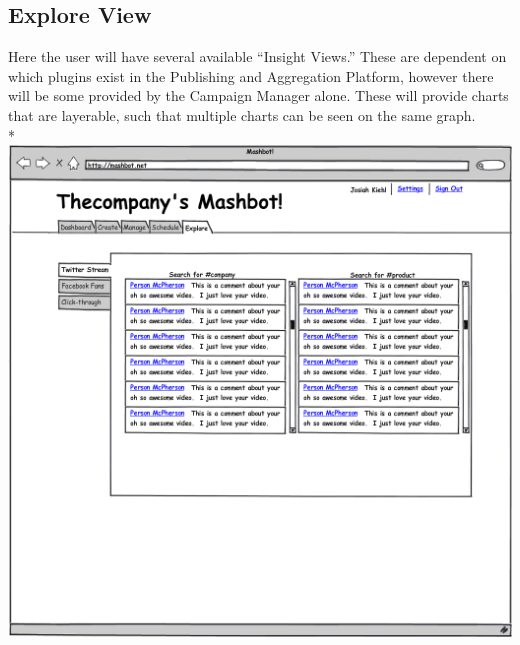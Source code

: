 \documentclass{report}
\begin{document}
\subsection{Explore View}
 Here the user will have several available ``Insight Views.''  These are dependent on which plugins exist in the Publishing and Aggregation Platform, however there will be some provided by the Campaign Manager alone.  These will provide charts that are layerable, such that multiple charts can be seen on the same graph. \\*
  \includegraphics[width=\textwidth]{../mockups/explore-twitter.png}
\end{document}
